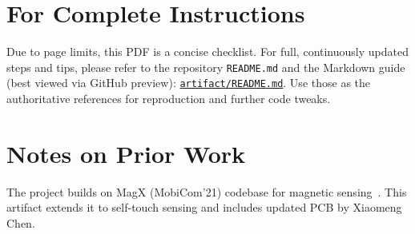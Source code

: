 \documentclass[conference]{IEEEtran}
\begin{document}
\section{For Complete Instructions}
Due to page limits, this PDF is a concise checklist. For full, continuously updated steps and tips, please refer to the repository \texttt{README.md} and the Markdown guide (best viewed via GitHub preview): \href{https://github.com/Wangmerlyn/muTouch/blob/main/artifact/README.md}{\texttt{artifact/README.md}}. Use those as the authoritative references for reproduction and further code tweaks.

\section{Notes on Prior Work}
The project builds on MagX (MobiCom'21) codebase for magnetic sensing~\cite{mag_x}. This artifact extends it to self-touch sensing and includes updated PCB by Xiaomeng Chen.

\balance


\end{document}
